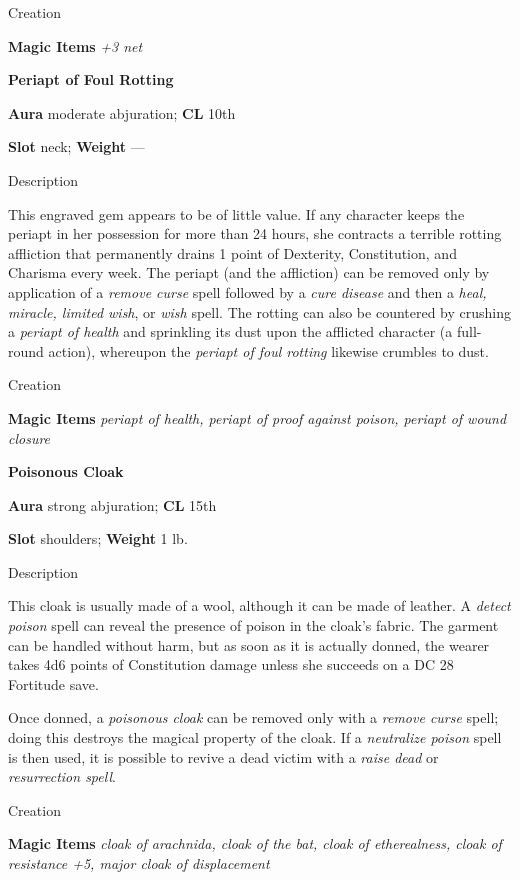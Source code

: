 Creation
				
\textbf{Magic Items}\textit{ +3 net}
				
\textbf{Periapt of Foul Rotting}
				
\textbf{Aura} moderate abjuration; \textbf{CL} 10th
				
\textbf{Slot} neck; \textbf{Weight }---
				
Description
				
This engraved gem appears to be of little value. If any character keeps the periapt in her possession for more than 24 hours, she contracts a terrible rotting affliction that permanently drains 1 point of Dexterity, Constitution, and Charisma every week. The periapt (and the affliction) can be removed only by application of a \textit{remove curse }spell followed by a \textit{cure disease }and then a \textit{heal, miracle, limited wish}, or \textit{wish }spell. The rotting can also be countered by crushing a \textit{periapt of health }and sprinkling its dust upon the afflicted character (a full-round action), whereupon the \textit{periapt of foul rotting} likewise crumbles to dust. 
				
Creation
				
\textbf{Magic Items}\textit{ periapt of health, periapt of proof against poison, periapt of wound closure}
				
\textbf{Poisonous Cloak}
				
\textbf{Aura} strong abjuration; \textbf{CL} 15th
				
\textbf{Slot} shoulders; \textbf{Weight }1 lb.
				
Description
				
This cloak is usually made of a wool, although it can be made of leather. A \textit{detect poison }spell can reveal the presence of poison in the cloak's fabric. The garment can be handled without harm, but as soon as it is actually donned, the wearer takes 4d6 points of Constitution damage unless she succeeds on a DC 28 Fortitude save. 
				
Once donned, a \textit{poisonous cloak} can be removed only with a \textit{remove curse} spell; doing this destroys the magical property of the cloak. If a \textit{neutralize poison} spell is then used, it is possible to revive a dead victim with a \textit{raise dead} or \textit{resurrection spell}. 
				
Creation
				
\textbf{Magic Items}\textit{ cloak of arachnida, cloak of the bat, cloak of etherealness, cloak of resistance +5, major cloak of displacement}
				
